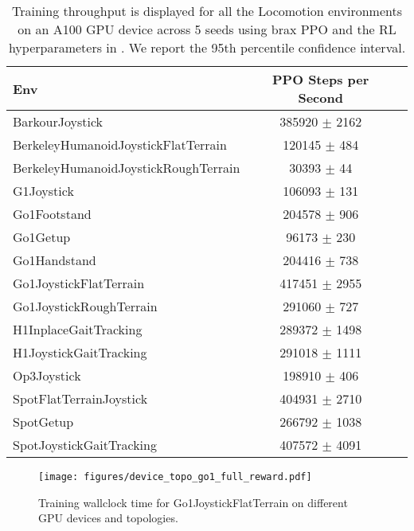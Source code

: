 \begin{table*}[ht]
\centering
\begin{tabular}{|l|c|c|}
\hline 
 Env                   & PPO Steps per Second     \\
\hline 
 BarkourJoystick                      & 385920 $\pm$ 2162 \\
 BerkeleyHumanoidJoystickFlatTerrain  & 120145 $\pm$ 484  \\
 BerkeleyHumanoidJoystickRoughTerrain & 30393 $\pm$ 44    \\
 G1Joystick                           & 106093 $\pm$ 131  \\
 Go1Footstand                         & 204578 $\pm$ 906  \\
 Go1Getup                             & 96173 $\pm$ 230   \\
 Go1Handstand                         & 204416 $\pm$ 738  \\
 Go1JoystickFlatTerrain               & 417451 $\pm$ 2955 \\
 Go1JoystickRoughTerrain              & 291060 $\pm$ 727  \\
 H1InplaceGaitTracking                & 289372 $\pm$ 1498 \\
 H1JoystickGaitTracking               & 291018 $\pm$ 1111 \\
 Op3Joystick                          & 198910 $\pm$ 406  \\
 SpotFlatTerrainJoystick              & 404931 $\pm$ 2710 \\
 SpotGetup                            & 266792 $\pm$ 1038 \\
 SpotJoystickGaitTracking             & 407572 $\pm$ 4091 \\
\hline 
\end{tabular}
\caption{Training throughput is displayed for all the Locomotion environments on an A100 GPU device across 5 seeds using brax PPO and the RL hyperparameters in . We report the 95th percentile confidence interval.}
\label{tab:locomotion_training_throughput}
\end{table*}

\begin{figure}[t]
    \centering
    \texttt{[image: figures/device\_topo\_go1\_full\_reward.pdf]}
    \caption{\small Training wallclock time for Go1JoystickFlatTerrain on different GPU devices and topologies.}
    \label{fig:go1_device_topo}
\end{figure}

\clearpage

